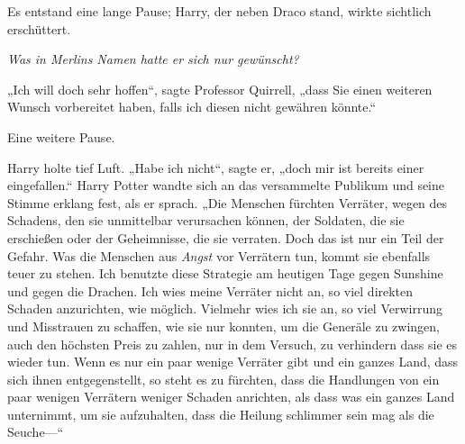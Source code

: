 Es entstand eine lange Pause; Harry, der neben Draco stand, wirkte sichtlich erschüttert.

\emph{Was in Merlins Namen hatte er sich nur gewünscht?}

„Ich will doch sehr hoffen“, sagte Professor Quirrell, „dass Sie einen weiteren Wunsch vorbereitet haben, falls ich diesen nicht gewähren könnte.“

Eine weitere Pause.

Harry holte tief Luft. „Habe ich nicht“, sagte er, „doch mir ist bereits einer eingefallen.“ Harry Potter wandte sich an das versammelte Publikum und seine Stimme erklang fest, als er sprach. „Die Menschen fürchten Verräter, wegen des Schadens, den sie unmittelbar verursachen können, der Soldaten, die sie erschießen oder der Geheimnisse, die sie verraten. Doch das ist nur ein Teil der Gefahr. Was die Menschen aus \emph{Angst} vor Verrätern tun, kommt sie ebenfalls teuer zu stehen. Ich benutzte diese Strategie am heutigen Tage gegen Sunshine und gegen die Drachen. Ich wies meine Verräter nicht an, so viel direkten Schaden anzurichten, wie möglich. Vielmehr wies ich sie an, so viel Verwirrung und Misstrauen zu schaffen, wie sie nur konnten, um die Generäle zu zwingen, auch den höchsten Preis zu zahlen, nur in dem Versuch, zu verhindern dass sie es wieder tun. Wenn es nur ein paar wenige Verräter gibt und ein ganzes Land, dass sich ihnen entgegenstellt, so steht es zu fürchten, dass die Handlungen von ein paar wenigen Verrätern weniger Schaden anrichten, als dass was ein ganzes Land unternimmt, um sie aufzuhalten, dass die Heilung schlimmer sein mag als die Seuche—“

